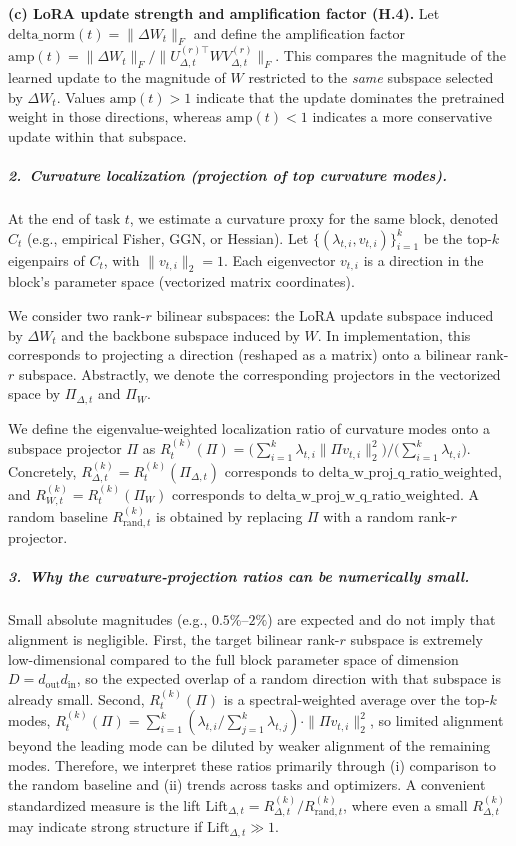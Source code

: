 \documentclass{article}
\theoremstyle{plain}
\theoremstyle{definition}
\theoremstyle{remark}
\begin{document}
\textbf{(c) LoRA update strength and amplification factor (H.4).}
Let $\mathrm{delta\_norm}(t)=\|\Delta W_t\|_F$ and define the amplification factor
$\mathrm{amp}(t)=\|\Delta W_t\|_F/\|U_{\Delta,t}^{(r)\top} W V_{\Delta,t}^{(r)}\|_F$.
This compares the magnitude of the learned update to the magnitude of $W$ restricted to the \emph{same} subspace selected by $\Delta W_t$. Values $\mathrm{amp}(t)>1$ indicate that the update dominates the pretrained weight in those directions, whereas $\mathrm{amp}(t)<1$ indicates a more conservative update within that subspace.

\subparagraph{2.\ Curvature localization (projection of top curvature modes).}
At the end of task $t$, we estimate a curvature proxy for the same block, denoted $C_t$ (e.g., empirical Fisher, GGN, or Hessian). Let $\{(\lambda_{t,i}, v_{t,i})\}_{i=1}^k$ be the top-$k$ eigenpairs of $C_t$, with $\|v_{t,i}\|_2=1$. Each eigenvector $v_{t,i}$ is a direction in the block's parameter space (vectorized matrix coordinates).

We consider two rank-$r$ bilinear subspaces: the LoRA update subspace induced by $\Delta W_t$ and the backbone subspace induced by $W$. In implementation, this corresponds to projecting a direction (reshaped as a matrix) onto a bilinear rank-$r$ subspace. Abstractly, we denote the corresponding projectors in the vectorized space by $\Pi_{\Delta,t}$ and $\Pi_W$.

We define the eigenvalue-weighted localization ratio of curvature modes onto a subspace projector $\Pi$ as
$R_t^{(k)}(\Pi)
=
\big(\sum_{i=1}^k \lambda_{t,i}\|\Pi v_{t,i}\|_2^2\big)\big/\big(\sum_{i=1}^k \lambda_{t,i}\big)$.
Concretely,
$R_{\Delta,t}^{(k)}=R_t^{(k)}(\Pi_{\Delta,t})$
corresponds to $\mathrm{delta\_w\_proj\_q\_ratio\_weighted}$, and
$R_{W,t}^{(k)}=R_t^{(k)}(\Pi_W)$
corresponds to $\mathrm{delta\_w\_proj\_w\_q\_ratio\_weighted}$.
A random baseline $R_{\mathrm{rand},t}^{(k)}$ is obtained by replacing $\Pi$ with a random rank-$r$ projector.

\subparagraph{3.\ Why the curvature-projection ratios can be numerically small.}
Small absolute magnitudes (e.g., $0.5\%$--$2\%$) are expected and do not imply that alignment is negligible. First, the target bilinear rank-$r$ subspace is extremely low-dimensional compared to the full block parameter space of dimension $D=d_{\mathrm{out}}d_{\mathrm{in}}$, so the expected overlap of a random direction with that subspace is already small. Second, $R_t^{(k)}(\Pi)$ is a spectral-weighted average over the top-$k$ modes,
$R_t^{(k)}(\Pi)=\sum_{i=1}^k (\lambda_{t,i}/\sum_{j=1}^k \lambda_{t,j})\cdot \|\Pi v_{t,i}\|_2^2$,
so limited alignment beyond the leading mode can be diluted by weaker alignment of the remaining modes. Therefore, we interpret these ratios primarily through (i) comparison to the random baseline and (ii) trends across tasks and optimizers. A convenient standardized measure is the lift
$\mathrm{Lift}_{\Delta,t}=R_{\Delta,t}^{(k)}/R_{\mathrm{rand},t}^{(k)}$,
where even a small $R_{\Delta,t}^{(k)}$ may indicate strong structure if $\mathrm{Lift}_{\Delta,t}\gg 1$.
\end{document}
